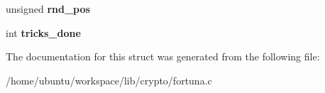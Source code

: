 \begin{DoxyCompactItemize}
\item 
\hypertarget{structfortuna__state_a6b390be97975dff29c08c06ecf1bdb3a}{unsigned {\bfseries rnd\-\_\-pos}}\label{structfortuna__state_a6b390be97975dff29c08c06ecf1bdb3a}

\item 
\hypertarget{structfortuna__state_a4ea7c5da5396b8f797f36993a98de5fe}{int {\bfseries tricks\-\_\-done}}\label{structfortuna__state_a4ea7c5da5396b8f797f36993a98de5fe}

\end{DoxyCompactItemize}


The documentation for this struct was generated from the following file\-:\begin{DoxyCompactItemize}
\item 
/home/ubuntu/workspace/lib/crypto/fortuna.\-c\end{DoxyCompactItemize}
